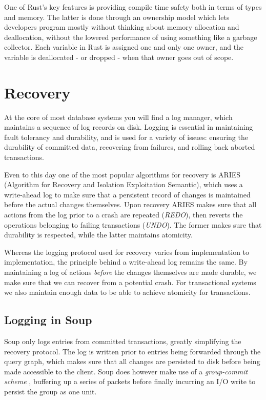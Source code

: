 \documentclass[b5paper]{report}
\begin{document}
One of Rust's key features is providing compile time safety both in terms of
types and memory. The latter is done through an ownership model which lets
developers program mostly without thinking about memory allocation and
deallocation, without the lowered performance of using something like a garbage
collector. Each variable in Rust is assigned one and only one owner, and the
variable is deallocated - or dropped - when that owner goes out of scope.

\section{Recovery}
At the core of most database systems you will find a log manager, which
maintains a sequence of log records on disk. Logging is essential in maintaining
fault tolerancy and durability, and is used for a variety of issues: ensuring
the durability of committed data, recovering from failures, and rolling back
aborted transactions.

Even to this day one of the most popular algorithms for recovery is ARIES
\cite{aries} (Algorithm for Recovery and Isolation Exploitation Semantic), which
uses a write-ahead log to make sure that a persistent record of changes is
maintained before the actual changes themselves. Upon recovery ARIES makes sure
that all actions from the log prior to a crash are repeated (\textit{REDO}),
then reverts the operations belonging to failing transactions (\textit{UNDO}).
The former makes sure that durability is respected, while the latter maintains
atomicity.

Whereas the logging protocol used for recovery varies from implementation to
implementation, the principle behind a write-ahead log remains the same. By
maintaining a log of actions \textit{before} the changes themselves are made
durable, we make sure that we can recover from a potential crash. For
transactional systems we also maintain enough data to be able to achieve
atomicity for transactions.

\subsection{Logging in Soup}
Soup only logs entries from committed transactions, greatly simplifying the
recovery protocol. The log is written prior to entries being forwarded
through the query graph, which makes sure that all changes are persisted to disk
before being made accessible to the client. Soup does however make use of a
\textit{group-commit scheme} \cite{main-memory}, buffering up a series of
packets before finally incurring an I/O write to persist the group as one unit.
\end{document}
